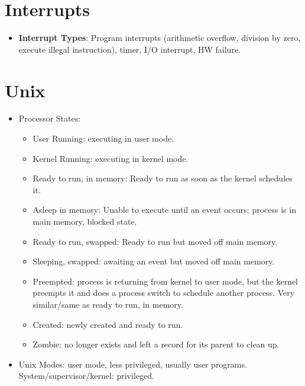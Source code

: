 \documentclass[fontsize=5pt]{scrartcl}
\begin{document}
\begin{multicols}{3}
   \section{Interrupts}
      \begin{itemize}
        \item \textbf{Interrupt Types}: Program interrupts (arithmetic overflow, division by zero, execute illegal instruction), timer, I/O interrupt, HW failure.
      \end{itemize}
    \section{Unix}
      \begin{itemize}
       \item Processor States:
        \begin{itemize}
         \item User Running: executing in user mode.
         \item Kernel Running: executing in kernel mode.
         \item Ready to run, in memory: Ready to run as soon as the kernel schedules it.
         \item Asleep in memory: Unable to execute until an event occurs; process is in main memory, blocked state.
         \item Ready to run, swapped: Ready to run but moved off main memory.
         \item Sleeping, swapped: awaiting an event but moved off main memory.
         \item Preempted: process is returning from kernel to user mode, but the kernel preempts it and does a process switch
               to schedule another process. Very similar/same as ready to run, in memory.
         \item Created: newly created and ready to run.
         \item Zombie: no longer exists and left a record for its parent to clean up.
        \end{itemize}
        \item Unix Modes: user mode, less privileged, usually user programs. System/supervisor/kernel: privileged.
      \end{itemize}
      

\end{multicols}
\end{document}

